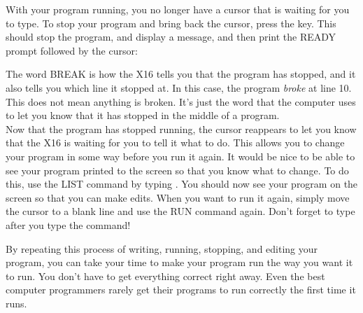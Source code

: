 With your program running, you no longer have a cursor that is waiting for you
to type.  To stop your program and bring back the cursor, press the
 key.  This should stop the program, and display a
message, and then print the {\ttfamily READY} prompt followed by the cursor:

\begin{center}
\end{center}

The word {\ttfamily BREAK} is how the X16 tells you that the program has
stopped, and it also tells you which line it stopped at.  In this case, the
program \emph{broke} at line 10.  This does not mean anything is broken.  It's
just the word that the computer uses to let you know that it has stopped in the
middle of a program.\\

Now that the program has stopped running, the cursor reappears to let you know
that the X16 is waiting for you to tell it what to do.  This allows you to
change your program in some way before you run it again.  It would be nice to
be able to see your program printed to the screen so that you know what to
change.  To do this, use the {\ttfamily LIST} command by typing
.  You should now see your program on the screen so that you
can make edits.  When you want to run it again, simply move the cursor to a
blank line and use the {\ttfamily RUN} command again.  Don't forget to type
 after you type the command!

By repeating this process of writing, running, stopping, and editing your
program, you can take your time to make your program run the way you want it to
run.  You don't have to get everything correct right away.  Even the best
computer programmers rarely get their programs to run correctly the first time
it runs.\\


